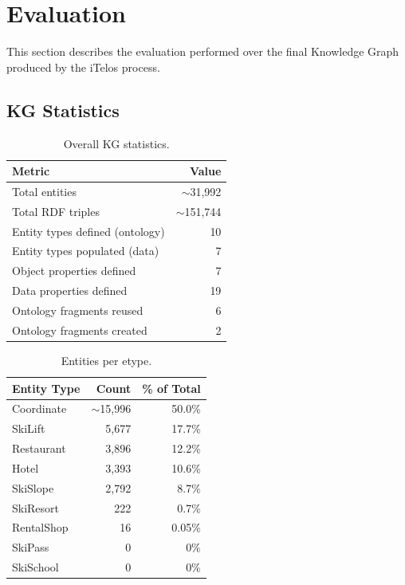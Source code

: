 \section{Evaluation}

This section describes the evaluation performed over the final Knowledge Graph produced by the iTelos process.

\subsection{KG Statistics}

\begin{table}[h!]
\centering
\begin{tabular}{|l|r|}
\hline
\textbf{Metric} & \textbf{Value} \\
\hline
Total entities & $\sim$31,992 \\
Total RDF triples & $\sim$151,744 \\
Entity types defined (ontology) & 10 \\
Entity types populated (data) & 7 \\
Object properties defined & 7 \\
Data properties defined & 19 \\
Ontology fragments reused & 6 \\
Ontology fragments created & 2 \\
\hline
\end{tabular}
\caption{Overall KG statistics.}
\end{table}

\begin{table}[h!]
\centering
\begin{tabular}{|l|r|r|}
\hline
\textbf{Entity Type} & \textbf{Count} & \textbf{\% of Total} \\
\hline
Coordinate & $\sim$15,996 & 50.0\% \\
SkiLift & 5,677 & 17.7\% \\
Restaurant & 3,896 & 12.2\% \\
Hotel & 3,393 & 10.6\% \\
SkiSlope & 2,792 & 8.7\% \\
SkiResort & 222 & 0.7\% \\
RentalShop & 16 & 0.05\% \\
SkiPass & 0 & 0\% \\
SkiSchool & 0 & 0\% \\
\hline
\end{tabular}
\caption{Entities per etype.}
\end{table}

